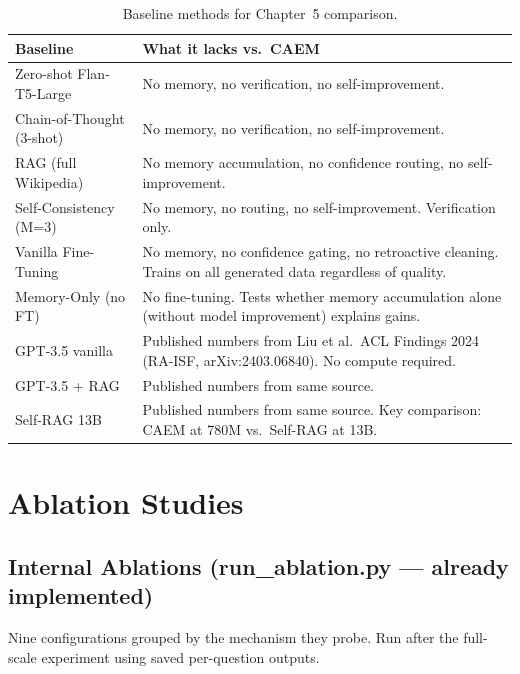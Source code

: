 \documentclass[12pt,a4paper]{article}
\newcommand{\caem}{CAEM}
\begin{document}
\begin{table}[htbp]
\centering
\caption{Baseline methods for Chapter~5 comparison.}
\label{tab:baselines}
\renewcommand{\arraystretch}{1.25}
\begin{tabular}{@{}p{3.8cm}p{9.0cm}@{}}
\toprule
\textbf{Baseline} & \textbf{What it lacks vs.\ \caem{}} \\
\midrule
Zero-shot Flan-T5-Large & No memory, no verification, no self-improvement. \\
Chain-of-Thought (3-shot) & No memory, no verification, no self-improvement. \\
RAG (full Wikipedia) & No memory accumulation, no confidence routing,
  no self-improvement. \\
Self-Consistency (M=3) & No memory, no routing, no self-improvement.
  Verification only. \\
Vanilla Fine-Tuning & No memory, no confidence gating, no retroactive cleaning.
  Trains on all generated data regardless of quality. \\
Memory-Only (no FT) & No fine-tuning. Tests whether memory accumulation alone
  (without model improvement) explains gains. \\
GPT-3.5 vanilla & Published numbers from Liu et al.\ ACL Findings 2024
  (RA-ISF, arXiv:2403.06840). No compute required. \\
GPT-3.5 + RAG & Published numbers from same source. \\
Self-RAG 13B & Published numbers from same source.
  Key comparison: CAEM at 780M vs.\ Self-RAG at 13B. \\
\bottomrule
\end{tabular}
\end{table}

\section{Ablation Studies}
\label{sec:ablations}

\subsection{Internal Ablations (run\_ablation.py --- already implemented)}

Nine configurations grouped by the mechanism they probe.
Run after the full-scale experiment using saved per-question outputs.
\end{document}
